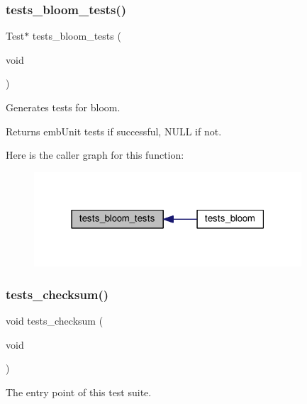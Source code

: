 \subsubsection{\texorpdfstring{tests\+\_\+bloom\+\_\+tests()}{tests\_bloom\_tests()}}
{\footnotesize\ttfamily Test$\ast$ tests\+\_\+bloom\+\_\+tests (\begin{DoxyParamCaption}\item[{void}]{ }\end{DoxyParamCaption})}



Generates tests for bloom. 

\begin{DoxyReturn}{Returns}
emb\+Unit tests if successful, N\+U\+LL if not. 
\end{DoxyReturn}
Here is the caller graph for this function\+:
\nopagebreak
\begin{figure}[H]
\begin{center}
\leavevmode
\includegraphics[width=283pt]{group__unittests_gaaa23c5835dcd15e549fc6bf7227a928e_icgraph}
\end{center}
\end{figure}
\mbox{\label{group__unittests_gae22a9f38219373678e7c27dbc0011406}} 
\subsubsection{\texorpdfstring{tests\+\_\+checksum()}{tests\_checksum()}}
{\footnotesize\ttfamily void tests\+\_\+checksum (\begin{DoxyParamCaption}\item[{void}]{ }\end{DoxyParamCaption})}



The entry point of this test suite. 

